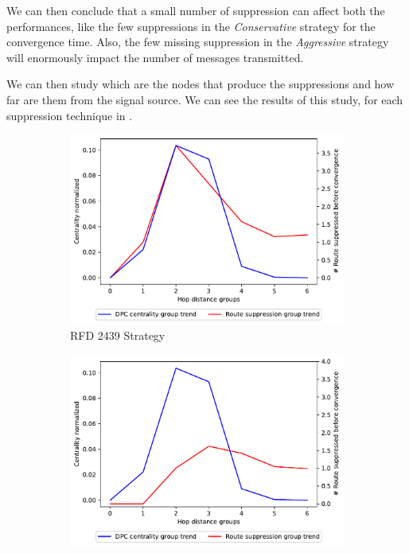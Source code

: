 We can then conclude that a small number of suppression can affect both the
performances, like the few suppressions in the \textit{Conservative} strategy
for the convergence time.
Also, the few missing suppression in the \textit{Aggressive} strategy will
enormously impact the number of messages transmitted.

We can then study which are the nodes that produce the suppressions and how
far are them from the signal source.
We can see the results of this study, for each suppression technique in .

\begin{figure}[h]
     \centering
     \begin{subfigure}[b]{0.325\textwidth}
         \centering
         \includegraphics[width=\textwidth]{images/RFD/miceVSelephants/mice/cisco_1000_RFD_nodeConvergence_centVSsup_trend.pdf}
         \caption{RFD 2439 Strategy}
         \label{fig:1000_2439RFD_centVSsup}
     \end{subfigure}
     \hfill
     \begin{subfigure}[b]{0.325\textwidth}
         \centering
         \includegraphics[width=\textwidth]{images/RFD/miceVSelephants/mice/cisco_1000_RFD_7196_aggressive_nodeConvergence_centVSsup_trend.pdf}

\end{subfigure}
\end{figure}
